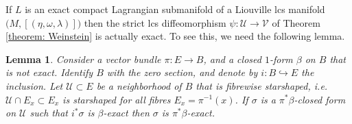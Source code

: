 \documentclass{amsart}
\newtheorem{lemma}[thm]{Lemma}
\theoremstyle{remark}
\begin{document}
If $L$ is an exact compact Lagrangian submanifold
of a Liouville lcs manifold $\big( M, [(\eta, \omega, \lambda)] \big)$
then the strict lcs diffeomorphism $\psi: \mathcal{U} \rightarrow \mathcal{V}$
of Theorem \ref{theorem: Weinstein}
is actually exact.
To see this,
we need the following lemma.

\begin{lemma}\label{lemma: Poincare}
Consider a vector bundle $\pi: E \rightarrow B$,
and a closed $1$-form $\beta$ on $B$
that is not exact.
Identify $B$ with the zero section,
and denote by $i: B \hookrightarrow E$ the inclusion.
Let $\mathcal{U} \subset E$ be a neighborhood of $B$
that is fibrewise starshaped,
i.e.\ $\mathcal{U} \cap E_x \subset E_x$ is starshaped
for all fibres $E_x = \pi^{-1} (x)$.
If $\sigma$ is a $\pi^{\ast}\beta$-closed form on $\mathcal{U}$
such that $i^{\ast} \sigma$ is $\beta$-exact
then $\sigma$ is $\pi^{\ast}\beta$-exact.
\end{lemma}
\end{document}
